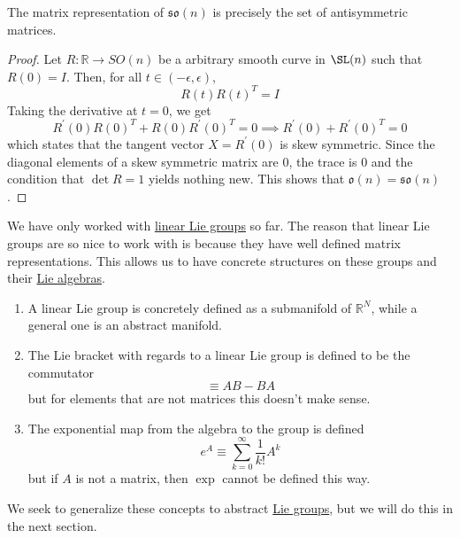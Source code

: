   \begin{theorem}
    \label{thm:matrix-form-of-mathfrakson}
    The matrix representation of $\mathfrak{so}(n)$ is precisely the set of antisymmetric matrices. 
  \end{theorem}
  \begin{proof}
    Let $R: \mathbb{R} \rightarrow SO(n)$ be a arbitrary smooth curve in $\SL(n)$ such that $R(0) = I$. Then, for all $t \in (-\epsilon, \epsilon)$, 
    \begin{equation}
      R(t) R(t)^T = I
    \end{equation}
    Taking the derivative at $t = 0$, we get
    \begin{equation}
      R^\prime (0) R(0)^T + R(0) R^\prime(0)^T = 0 \implies R^\prime (0) + R^\prime(0)^T = 0
    \end{equation}
    which states that the tangent vector $X = R^\prime (0)$ is skew symmetric. Since the diagonal elements of a skew symmetric matrix are $0$, the trace is $0$ and the condition that $\det{R} = 1$ yields nothing new. This shows that $\mathfrak{o}(n) = \mathfrak{so}(n)$. 
  \end{proof}




  We have only worked with \hyperref[def:linear-lie-group]{linear Lie groups} so far. The reason that linear Lie groups are so nice to work with is because they have well defined matrix representations. This allows us to have concrete structures on these groups and their \hyperref[def:lie-algebra]{Lie algebras}. 
  \begin{enumerate}
    \item A linear Lie group is concretely defined as a submanifold of $\mathbb{R}^N$, while a general one is an abstract manifold. 
    \item The Lie bracket with regards to a linear Lie group is defined to be the commutator 
      \begin{equation}
        [A,B] \equiv A B - B A
      \end{equation}
    but for elements that are not matrices this doesn't make sense. 

    \item The exponential map from the algebra to the group is defined
      \begin{equation}
        e^A \equiv \sum_{k=0}^\infty \frac{1}{k!} A^k
      \end{equation}
    but if $A$ is not a matrix, then $\exp$ cannot be defined this way.
  \end{enumerate}
  We seek to generalize these concepts to abstract \hyperref[def:lie-group]{Lie groups}, but we will do this in the next section. 

